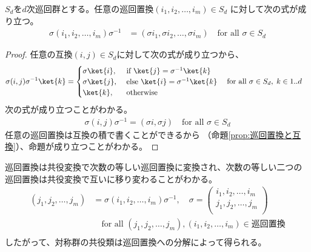 	\begin{proposition}[巡回置換の共役変換]\label{prop:巡回置換の共役変換} %
		$S_d$を$d$次巡回群とする。任意の巡回置換$(i_1,i_2,\dots,i_m)\in S_d$
		に対して次の式が成り立つ。
		\begin{equation*}\begin{split} %
			\sigma(i_1,i_2,\dots,i_m)\sigma^{-1}
			&= (\sigma i_1,\sigma i_2,\dots,\sigma i_m)
			\quad\text{for all }\sigma\in S_d
		\end{split}\end{equation*} %
	\end{proposition} %
	\begin{proof} %
		任意の互換$(i,j)\in S_d$に対して次の式が成り立つから、
		\begin{equation*}\begin{split} %
			\sigma(i,j)\sigma^{-1}\ket{k} &= \begin{cases}
				\sigma\ket{i}, &\text{ if }\ket{j}=\sigma^{-1}\ket{k} \\
				\sigma\ket{j}, &\text{ else }\ket{i}=\sigma^{-1}\ket{k} \\
				\ket{k}, &\text{ otherwise } \\
			\end{cases} \quad\text{for all }\sigma\in S_d,\;k\in1..d
		\end{split}\end{equation*} %
		次の式が成り立つことがわかる。
		\begin{equation*}\begin{split} %
			\sigma(i,j)\sigma^{-1} = (\sigma i, \sigma j)
			\quad\text{for all }\sigma\in S_d
		\end{split}\end{equation*} %
		任意の巡回置換は互換の積で書くことができるから
		（命題\ref{prop:巡回置換と互換}）、命題が成り立つことがわかる。
	\end{proof} %

	巡回置換は共役変換で次数の等しい巡回置換に変換され、次数の等しい二つの
	巡回置換は共役変換で互いに移り変わることがわかる。
	\begin{equation}\label{eq:巡回置換の共役変換}\begin{split} %
		(j_1,j_2,\dots,j_m) &= \sigma(i_1,i_2,\dots,i_m)\sigma^{-1}
		,\quad \sigma = \begin{pmatrix}
			i_1,i_2,\dots,i_m \\
			j_1,j_2,\dots,j_m \\
		\end{pmatrix} \\
		& \quad\text{for all }
		(j_1,j_2,\dots,j_m),(i_1,i_2,\dots,i_m)\in \text{巡回置換} \\
	\end{split}\end{equation} %
	したがって、対称群の共役類は巡回置換への分解によって得られる。

